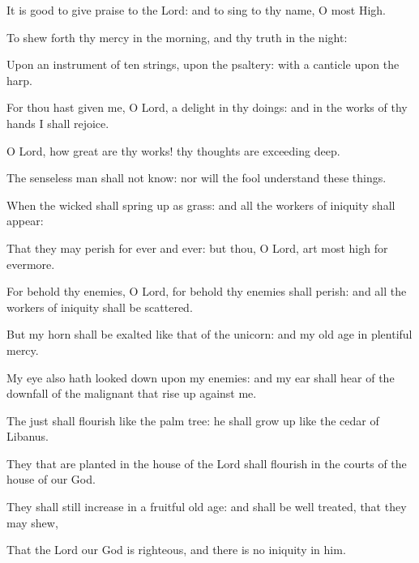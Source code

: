 \item It is good to give praise to the Lord: and to sing to thy name, O most High.
\item To shew forth thy mercy in the morning, and thy truth in the night:
\item Upon an instrument of ten strings, upon the psaltery: with a canticle upon the harp.
\item For thou hast given me, O Lord, a delight in thy doings: and in the works of thy hands I shall rejoice.
\item O Lord, how great are thy works! thy thoughts are exceeding deep.
\item The senseless man shall not know: nor will the fool understand these things.
\item When the wicked shall spring up as grass: and all the workers of iniquity shall appear:
\item That they may perish for ever and ever: but thou, O Lord, art most high for evermore.
\item For behold thy enemies, O Lord, for behold thy enemies shall perish: and all the workers of iniquity shall be scattered.
\item But my horn shall be exalted like that of the unicorn: and my old age in plentiful mercy.
\item My eye also hath looked down upon my enemies: and my ear shall hear of the downfall of the malignant that rise up against me.
\item The just shall flourish like the palm tree: he shall grow up like the cedar of Libanus.
\item They that are planted in the house of the Lord shall flourish in the courts of the house of our God.
\item They shall still increase in a fruitful old age: and shall be well treated, that they may shew,
\item That the Lord our God is righteous, and there is no iniquity in him.
